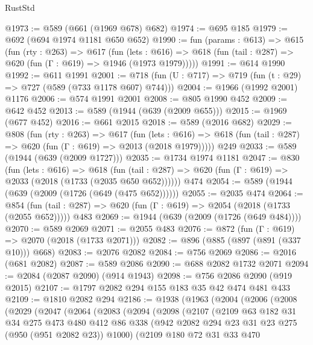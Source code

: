 \begin{lexlean}{RustStd}
\begin{coremodule}
@1973 := @589 (@661 (@1969 @678) @682)
@1974 := @695 @185
@1979 := @692 (@694 @1974 @1181 @650 @652)
@1990 := fun (params : @613) =>
  @615
    (fun (rty : @263) =>
    @617
      (fun (lets : @616) =>
      @618 (fun (tail : @287) => @620 (fun (Γ : @619) => @1946 (@1973 @1979)))))
@1991 := @614 @1990
@1992 := @611 @1991
@2001 := @718 (fun (U : @717) => @719 (fun (t : @29) => @727 (@589 (@733 @1178 @607) @744)))
@2004 := @1966 (@1992 @2001) @1176
@2006 := @574 @1991 @2001
@2008 := @805 @1990 @452
@2009 := @642 @452
@2013 := @589 (@1944 (@639 (@2009 @655)))
@2015 := @1969 (@677 @452)
@2016 := @661 @2015
@2018 := @589 (@2016 @682)
@2029 := @808
    (fun (rty : @263) =>
    @617
      (fun (lets : @616) =>
      @618 (fun (tail : @287) => @620 (fun (Γ : @619) => @2013 (@2018 @1979)))))
    @249
@2033 := @589 (@1944 (@639 (@2009 @1727)))
@2035 := @1734 @1974 @1181
@2047 := @830
    (fun (lets : @616) =>
    @618 (fun (tail : @287) => @620 (fun (Γ : @619) => @2033 (@2018 (@1733 (@2035 @650 @652))))))
    @474
@2054 := @589 (@1944 (@639 (@2009 (@1726 (@649 (@475 @652))))))
@2055 := @2035 @474
@2064 := @854
    (fun (tail : @287) => @620 (fun (Γ : @619) => @2054 (@2018 (@1733 (@2055 @652)))))
    @483
@2069 := @1944 (@639 (@2009 (@1726 (@649 @484))))
@2070 := @589 @2069
@2071 := @2055 @483
@2076 := @872 (fun (Γ : @619) => @2070 (@2018 (@1733 @2071)))
@2082 := @896 (@885 (@897 (@891 (@337 @10))) @668)
@2083 := @2076 @2082
@2084 := @756 @2069
@2086 := @2016 (@681 @2082)
@2087 := @589 @2086
@2090 := @688 @2082 @1732 @2071
@2094 := @2084 (@2087 @2090) (@914 @1943)
@2098 := @756 @2086 @2090 (@919 @2015)
@2107 := @1797 @2082 @294 @155 @183 @35 @42 @474 @481 @433
@2109 := @1810 @2082 @294
@2186 := @1938
    (@1963
      (@2004
        (@2006
          (@2008
            (@2029
              (@2047
                (@2064
                  (@2083
                    (@2094
                      (@2098
                        (@2107
                          (@2109
                            @63
                            @182
                            @31
                            @34
                            @275
                            @473
                            @480
                            @412
                            @86
                            @338
                            (@942 @2082 @294 @23 @31 @23 @275 (@950 (@951 @2082 @23)) @1000)
                            (@2109
                              @180
                              @72
                              @31
                              @33
                              @470

\end{coremodule}
\end{lexlean}
